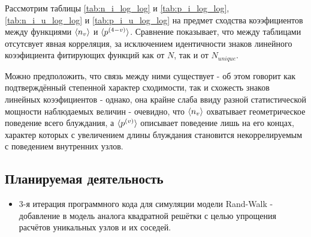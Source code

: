 Рассмотрим таблицы \ref{tab:n_i_log_log} и \ref{tab:p_i_log_log}, \ref{tab:n_i_u_log_log} и \ref{tab:p_i_u_log_log} на предмет сходства коээфициентов между функциями $\langle n_v \rangle$ и $\langle p^{(4-v)} \rangle$.
Сравнение показывает, что между таблицами отсутсвует явная корреляция, за исключением идентичности знаков линейного коээфициента фитирующих функций как от $N$, так и от $N_{unique}$. 

Можно предположить, что связь между ними существует - об этом говорит как подтверждённый степенной характер сходимости, так и схожесть знаков линейных коээфициентов - однако, она крайне слаба ввиду разной статистической мощности наблюдаемых величин - очевидно, что $\langle n_v \rangle$ охватывает геометрическое поведение всего блуждания, а $\langle p^{(v)} \rangle$ описывает поведение лишь на его концах, характер которых с увеличением длины блуждания становится некоррелируемым с поведением внутренних узлов.

\newpage

\subsection{Планируемая деятельность}

\begin{itemize}
\item 3-я итерация программного кода для симуляции модели Rand-Walk - добавление в модель аналога квадратной решётки с целью упрощения расчётов уникальных узлов и их соседей.
\end{itemize}
